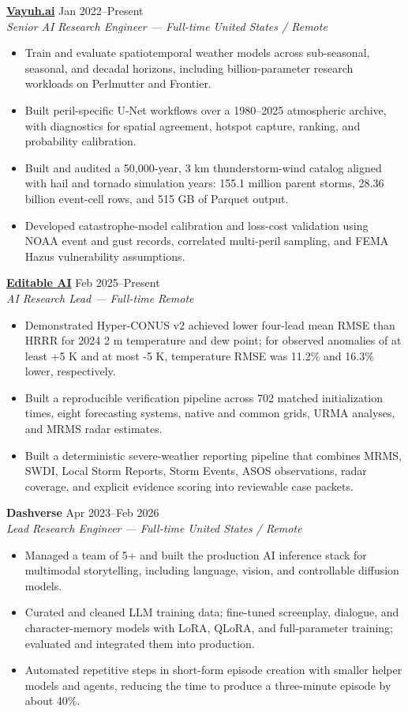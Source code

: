\documentclass[10pt,letterpaper]{article}
\newcommand{\job}[4]{%
  \textbf{#1} \hfill #2\\
  \textit{#3} \hfill \textit{#4}\vspace{1pt}
}
\begin{document}
\job{\href{https://www.vayuh.ai/}{Vayuh.ai}}{Jan 2022--Present}{Senior AI Research Engineer --- Full-time}{United States / Remote}
\begin{itemize}
  \item Train and evaluate spatiotemporal weather models across sub-seasonal, seasonal, and decadal horizons, including billion-parameter research workloads on Perlmutter and Frontier.
  \item Built peril-specific U-Net workflows over a 1980--2025 atmospheric archive, with diagnostics for spatial agreement, hotspot capture, ranking, and probability calibration.
  \item Built and audited a 50,000-year, 3 km thunderstorm-wind catalog aligned with hail and tornado simulation years: 155.1 million parent storms, 28.36 billion event-cell rows, and 515 GB of Parquet output.
  \item Developed catastrophe-model calibration and loss-cost validation using NOAA event and gust records, correlated multi-peril sampling, and FEMA Hazus vulnerability assumptions.
\end{itemize}

\job{\href{https://www.editable.ai/}{Editable AI}}{Feb 2025--Present}{AI Research Lead --- Full-time}{Remote}
\begin{itemize}
  \item Demonstrated Hyper-CONUS v2 achieved lower four-lead mean RMSE than HRRR for 2024 2 m temperature and dew point; for observed anomalies of at least +5 K and at most -5 K, temperature RMSE was 11.2\% and 16.3\% lower, respectively.
  \item Built a reproducible verification pipeline across 702 matched initialization times, eight forecasting systems, native and common grids, URMA analyses, and MRMS radar estimates.
  \item Built a deterministic severe-weather reporting pipeline that combines MRMS, SWDI, Local Storm Reports, Storm Events, ASOS observations, radar coverage, and explicit evidence scoring into reviewable case packets.
\end{itemize}

\job{Dashverse}{Apr 2023--Feb 2026}{Lead Research Engineer --- Full-time}{United States / Remote}
\begin{itemize}
  \item Managed a team of 5+ and built the production AI inference stack for multimodal storytelling, including language, vision, and controllable diffusion models.
  \item Curated and cleaned LLM training data; fine-tuned screenplay, dialogue, and character-memory models with LoRA, QLoRA, and full-parameter training; evaluated and integrated them into production.
  \item Automated repetitive steps in short-form episode creation with smaller helper models and agents, reducing the time to produce a three-minute episode by about 40\%.
\end{itemize}
\end{document}
